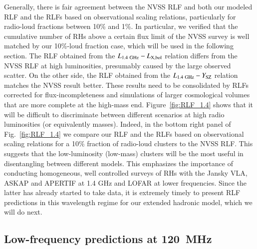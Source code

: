 \documentclass[useAMS,usenatbib]{mn2e}
\begin{document}
Generally, there is fair agreement between the NVSS RLF and both our modeled RLF
and the RLFs based on observational scaling relations, particularly for
radio-loud fractions between 10\% and 1\%. In particular, we verified that the
cumulative number of RHs above a certain flux limit of the NVSS survey is well
matched by our 10\%-loud fraction case, which will be used in the following
section.  The RLF obtained from the $L_{1.4~{\mathrm{GHz}}}-L_{{\mathrm{X,bol}}}$ relation
differs from the NVSS RLF at high luminosities, presumably caused by the large
observed scatter.  On the other side, the RLF obtained from the
$L_{1.4~{\mathrm{GHz}}}-Y_{{\mathrm{SZ}}}$ relation matches the NVSS result better. These
results need to be consolidated by RLFs corrected for flux-incompleteness and
simulations of larger cosmological volumes that are more complete at the
high-mass end. Figure~\ref{fig:RLF_1.4} shows that it will be difficult to
discriminate between different scenarios at high radio luminosities (or
equivalently masses). Indeed, in the bottom right panel of
Fig.~\ref{fig:RLF_1.4} we compare our RLF and the RLFs based on observational
scaling relations for a 10\% fraction of radio-loud clusters to the NVSS
RLF. This suggests that the low-luminosity (low-mass) clusters will be the most
useful in disentangling between different models. This emphasizes the importance
of conducting homogeneous, well controlled surveys of RHs with the
Jansky VLA, ASKAP \citep{2011PASA...28..215N} and APERTIF
\citep{2012JApA..tmp...34R} at 1.4 GHz and LOFAR at lower frequencies. Since the
latter has already started to take data, it is extremely timely to present RLF
predictions in this wavelength regime for our extended hadronic model, which 
we will do next.


\subsection{Low-frequency predictions at 120~MHz}
\end{document}

